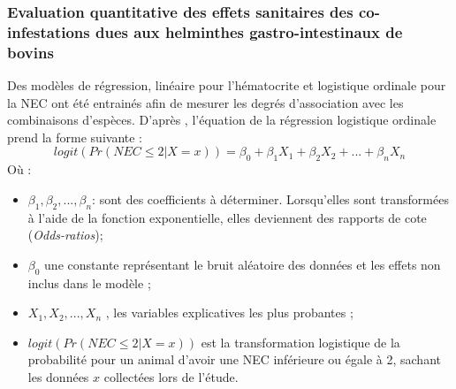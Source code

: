 \subsubsection{Evaluation quantitative des effets sanitaires des co-infestations dues aux 
helminthes gastro-intestinaux de bovins}

\par Des modèles de régression, linéaire pour l'hématocrite et logistique ordinale pour 
la NEC ont été entrainés afin de mesurer les degrés d'association avec les combinaisons 
d'espèces. D'après , l'équation de la régression logistique ordinale 
prend la forme suivante :
\begin{equation*}
	logit(Pr(NEC \leq{2} | X = x))= \beta _{0} + \beta _{1}X_{1} + \beta _{2}X_{2} 
		+ ... + \beta _{n}X_{n}
\end{equation*}
Où :
\begin{itemize}
	\item  $ \beta _{1} , \beta _{2}, ... , \beta _{n} $: sont des coefficients à déterminer.  
	Lorsqu'elles sont transformées à l'aide de la fonction exponentielle, elles deviennent 
	des rapports de cote (\textit{Odds-ratios});
	\item $ \beta _{0} $ une constante représentant le bruit aléatoire des données et les 
	effets non inclus dans le
	modèle ;
	\item $ X_{1} , X_{2}, ..., X_{n} $ , les variables explicatives les plus probantes ;
	\item  $logit(Pr(NEC \leq{2} | X=x))$ est la transformation logistique de la probabilité 
	pour un animal d'avoir une NEC inférieure ou égale à 2, sachant les données $x$ 
	collectées lors de l'étude. 
\end{itemize}